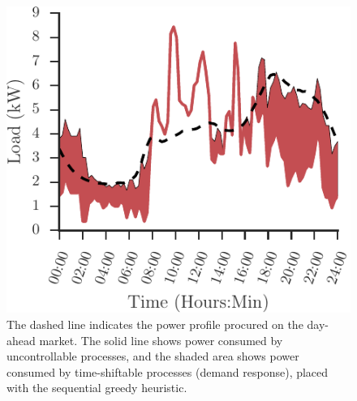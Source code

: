 \documentclass[conference]{IEEEtran}
\begin{document}
\begin{figure}[b]
\centering
\vspace{6.4mm}\includegraphics[scale=0.9]{figures/movable.pdf}
\caption{The dashed line indicates the power profile procured on the day-ahead market. The solid line shows power consumed by uncontrollable processes, and the shaded area shows power consumed by time-shiftable processes (demand response), placed with the sequential greedy heuristic.}
\label{fig:movable}
\end{figure}


\end{document}
